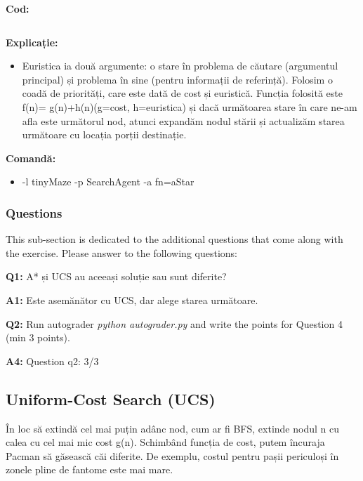 \textbf{Cod:}
\begin{listing}[h]
    \inputminted[linenos]{python}{code/04_a_star.py}
\end{listing}


\textbf{Explicație:}
\begin{itemize}
    \setlength\itemsep{0em}
    \item Euristica ia două argumente: o stare în problema de căutare (argumentul principal) și problema în sine (pentru informații de referință). Folosim o coadă de priorități, care este dată de cost și euristică. Funcția folosită este f(n)= g(n)+h(n)(g=cost, h=euristica) și dacă următoarea stare în care ne-am afla este următorul nod, atunci expandăm nodul stării și actualizăm starea următoare cu locația porții destinație. 

\end{itemize}


\textbf{Comandă:}
\begin{itemize}
    \setlength\itemsep{0em}
    \item  -l tinyMaze -p SearchAgent -a fn=aStar
        
\end{itemize}

\subsubsection{Questions}
This sub-section is dedicated to the additional questions that come along with the exercise. Please answer to the following questions:\newline


\textbf{Q1:} A* și UCS au aceeași soluție sau sunt diferite?

\textbf{A1:} Este asemănător cu UCS, dar alege starea următoare.\newline

\textbf{Q2:} Run autograder \textit{python autograder.py} and write the points for Question 4 (min 3 points).


\textbf{A4:}  Question q2: 3/3

\vspace{0.75cm}
\pagebreak

\subsection{Uniform-Cost Search (UCS)}
În loc să extindă cel mai puțin adânc nod, cum ar fi BFS, extinde nodul n cu calea cu cel mai mic cost g(n). Schimbând funcția de cost, putem încuraja Pacman să găsească căi diferite. De exemplu, costul pentru pașii periculoși în zonele pline de fantome este mai mare.\newline


